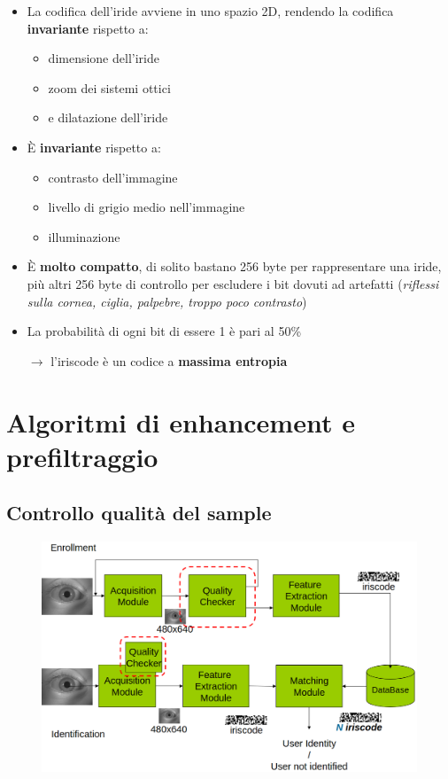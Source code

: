 \documentclass{report}
\begin{document}
\begin{itemize}
    \item La codifica dell'iride avviene in uno spazio 2D, rendendo la codifica \textbf{invariante}
    rispetto a:
    \begin{itemize}
        \item dimensione dell'iride
        \item zoom dei sistemi ottici
        \item e dilatazione dell'iride
    \end{itemize}
    \item È \textbf{invariante} rispetto a:
    \begin{itemize}
        \item contrasto dell'immagine 
        \item livello di grigio medio nell'immagine 
        \item illuminazione
    \end{itemize}
    \item È \textbf{molto compatto}, di solito bastano 256 byte per rappresentare una iride, più altri 
    256 byte di controllo per escludere i bit dovuti ad artefatti (\textit{riflessi sulla cornea, ciglia, palpebre, troppo poco contrasto})
    \item La probabilità di ogni bit di essere 1 è pari al 50\%
    
    $\rightarrow$ l'iriscode è un codice a \textbf{massima entropia}
\end{itemize}

\chapter{Algoritmi di enhancement e prefiltraggio}

\section{Controllo qualità del sample}
\begin{figure}[ht]
    \centering
    \includegraphics[width=1\linewidth]{images/prefiltraggio.png}
\end{figure}
\end{document}
